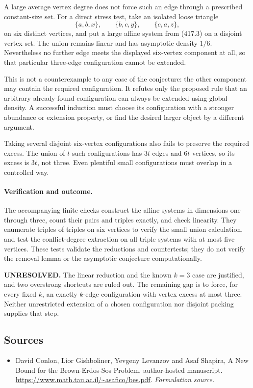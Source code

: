 \documentclass[11pt]{article}
\begin{document}
A large average vertex degree does not force such an edge through a prescribed constant-size set. For a direct stress test, take an isolated loose triangle
\[
 \{a,b,x\},\qquad \{b,c,y\},\qquad \{c,a,z\},
\]
on six distinct vertices, and put a large affine system from (417.3) on a disjoint vertex set. The union remains linear and has asymptotic density $1/6$. Nevertheless no further edge meets the displayed six-vertex component at all, so that particular three-edge configuration cannot be extended.

This is not a counterexample to any case of the conjecture: the other component may contain the required configuration. It refutes only the proposed rule that an arbitrary already-found configuration can always be extended using global density. A successful induction must choose its configuration with a stronger abundance or extension property, or find the desired larger object by a different argument.

Taking several disjoint six-vertex configurations also fails to preserve the required excess. The union of $t$ such configurations has $3t$ edges and $6t$ vertices, so its excess is $3t$, not three. Even plentiful small configurations must overlap in a controlled way.

\paragraph{Verification and outcome.}
The accompanying finite checks construct the affine systems in dimensions one through three, count their pairs and triples exactly, and check linearity. They enumerate triples of triples on six vertices to verify the small union calculation, and test the conflict-degree extraction on all triple systems with at most five vertices. These tests validate the reductions and countertests; they do not verify the removal lemma or the asymptotic conjecture computationally.

\textbf{UNRESOLVED.} The linear reduction and the known $k=3$ case are justified, and two overstrong shortcuts are ruled out. The remaining gap is to force, for every fixed $k$, an exactly $k$-edge configuration with vertex excess at most three. Neither unrestricted extension of a chosen configuration nor disjoint packing supplies that step.

\subsection{Sources}
\begin{itemize}
\item[S1]David Conlon, Lior Gishboliner, Yevgeny Levanzov and Asaf Shapira, A New Bound for the Brown-Erdos-Sos Problem, author-hosted manuscript.
\url{https://www.math.tau.ac.il/~asafico/bes.pdf}.
\textit{Formulation source.}
\end{itemize}
\end{document}
